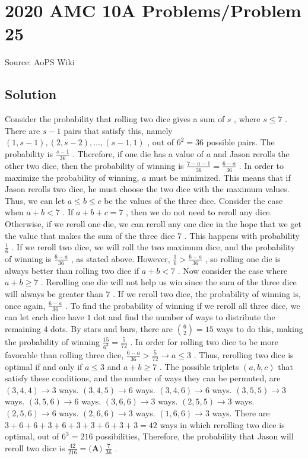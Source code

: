 \documentclass[12pt]{article}
\begin{document}
\section*{{2020 AMC 10A Problems/Problem 25}}
Source: AoPS Wiki

\subsection*{Solution}
Consider the probability that rolling two dice gives a sum of $s$ , where $s \leq 7$ . There are $s - 1$ pairs that satisfy this, namely $(1, s - 1), (2, s - 2), \ldots, (s - 1, 1)$ , out of $6^2 = 36$ possible pairs. The probability is $\frac{s - 1}{36}$ . Therefore, if one die has a value of $a$ and Jason rerolls the other two dice, then the probability of winning is $\frac{7 - a - 1}{36} = \frac{6 - a}{36}$ . In order to maximize the probability of winning, $a$ must be minimized. This means that if Jason rerolls two dice, he must choose the two dice with the maximum values. Thus, we can let $a \leq b \leq c$ be the values of the three dice. Consider the case when $a + b < 7$ . If $a + b + c = 7$ , then we do not need to reroll any dice. Otherwise,
if we reroll one die, we can reroll any one dice in the hope that we get the value that makes the sum of the three dice $7$ . This happens with probability $\frac16$ . If we reroll two dice, we will roll the two maximum dice, and the probability of winning is $\frac{6 - a}{36}$ , as stated above. However, $\frac16 > \frac{6 - a}{36}$ , so rolling one die is always better than rolling two dice if $a + b < 7$ . Now consider the case where $a + b \geq 7$ . Rerolling one die will not help us win since the sum of the three dice will always be greater than $7$ . If we reroll two dice, the probability of winning is, once again, $\frac{6 - a}{36}$ . To find the probability of winning if we reroll all three dice, we can let each dice have $1$ dot and find the number of ways to distribute the remaining $4$ dots. By stars and bars, there are ${6\choose2} = 15$ ways to do this, making the probability of winning $\frac{15}{6^3} = \frac5{72}$ . In order for rolling two dice to be more favorable than rolling three dice, $\frac{6 - a}{36} > \frac5{72} \rightarrow a \leq 3$ . Thus, rerolling two dice is optimal if and only if $a \leq 3$ and $a + b \geq 7$ . The possible triplets $(a, b, c)$ that satisfy these conditions, and the number of ways they can be permuted, are $(3, 4, 4) \rightarrow 3$ ways. $(3, 4, 5) \rightarrow 6$ ways. $(3, 4, 6) \rightarrow 6$ ways. $(3, 5, 5) \rightarrow 3$ ways. $(3, 5, 6) \rightarrow 6$ ways. $(3, 6, 6) \rightarrow 3$ ways. $(2, 5, 5) \rightarrow 3$ ways. $(2, 5, 6) \rightarrow 6$ ways. $(2, 6, 6) \rightarrow 3$ ways. $(1, 6, 6) \rightarrow 3$ ways. There are $3 + 6 + 6 + 3 + 6 + 3 + 3 + 6 + 3 + 3 = 42$ ways in which rerolling two dice is optimal, out of $6^3 = 216$ possibilities, Therefore, the probability that Jason will reroll two dice is $\frac{42}{216} = \boxed{\textbf{(A) } \frac{7}{36}}$ .
\end{document}
